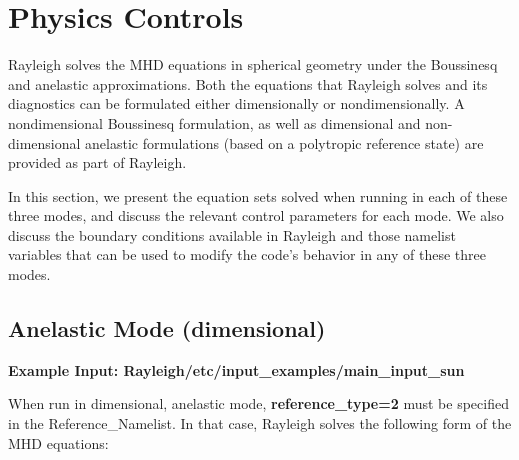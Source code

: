 \clearpage
\section{Physics Controls}\label{sec:physics}
Rayleigh solves the MHD equations in spherical geometry under the Boussinesq and anelastic approximations.  Both the equations that Rayleigh solves and its diagnostics can be formulated either dimensionally or nondimensionally.  A nondimensional Boussinesq formulation, as well as dimensional and non-dimensional anelastic formulations (based on a polytropic reference state) are provided as part of Rayleigh.  

In this section, we present the equation sets solved when running in each of these three modes, and discuss the relevant control parameters for each mode.   We also discuss the boundary conditions available in Rayleigh and those namelist variables that can be used to modify the code's behavior in any of these three modes.

\subsection{Anelastic Mode (dimensional)}

\textbf{Example Input:  Rayleigh/etc/input\_examples/main\_input\_sun}

When run in dimensional, anelastic mode, \textbf{reference\_type=2} must be specified in the Reference\_Namelist.  In that case, Rayleigh solves the following form of the MHD equations:



